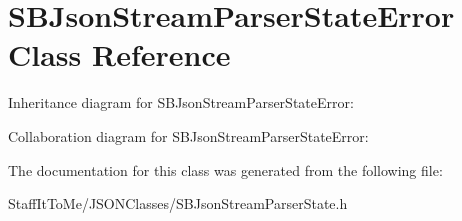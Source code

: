 \hypertarget{interface_s_b_json_stream_parser_state_error}{
\section{\-S\-B\-Json\-Stream\-Parser\-State\-Error \-Class \-Reference}
\label{interface_s_b_json_stream_parser_state_error}
}


\-Inheritance diagram for \-S\-B\-Json\-Stream\-Parser\-State\-Error\-:


\-Collaboration diagram for \-S\-B\-Json\-Stream\-Parser\-State\-Error\-:


\-The documentation for this class was generated from the following file\-:\begin{DoxyCompactItemize}
\item 
\-Staff\-It\-To\-Me/\-J\-S\-O\-N\-Classes/\-S\-B\-Json\-Stream\-Parser\-State.\-h\end{DoxyCompactItemize}
